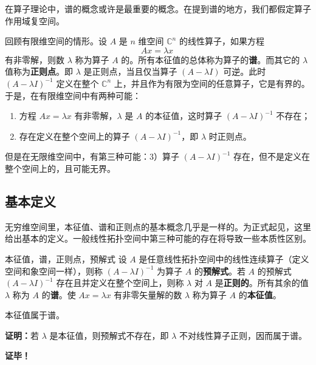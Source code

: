 
\cite{Ke1}在算子理论中，谱的概念或许是最重要的概念。在提到谱的地方，我们都假定算子作用域复空间。

回顾有限维空间的情形。设 $A$ 是 $n$ 维空间 $\mathbb C^n$ 的线性算子，如果方程
\begin{equation}
Ax=\lambda x~
\end{equation}
有非零解，则数 $\lambda$ 称为算子 $A$ 的。所有本征值的总体称为算子的\textbf{谱}。而其它的 $\lambda$ 值称为\textbf{正则点}。即 $\lambda$ 是正则点，当且仅当算子 $(A-\lambda I)$ 可逆。此时 $(A-\lambda I)^{-1}$ 定义在整个 $\mathbb C^n$ 上，并且作为有限为空间的任意算子，它是有界的。于是，在有限维空间中有两种可能：
\begin{enumerate}
\item 方程 $Ax=\lambda x$ 有非零解，$\lambda$ 是 $A$ 的本征值，这时算子 $(A-\lambda I)^{-1}$ 不存在；
\item 存在定义在整个空间上的算子 $(A-\lambda I)^{-1}$，即 $\lambda$ 时正则点。
\end{enumerate}

但是在无限维空间中，有第三种可能：3）算子 $(A-\lambda I)^{-1}$ 存在，但不是定义在整个空间上的，且可能无界。
\subsection{基本定义}
无穷维空间里，本征值、谱和正则点的基本概念几乎是一样的。为正式起见，这里给出基本的定义。一般线性拓扑空间中第三种可能的存在将导致一些本质性区别。
\begin{definition}{本征值，谱，正则点，预解式}
设 $A$ 是任意线性拓扑空间中的线性连续算子（定义空间和象空间一样），则称 $(A-\lambda I)^{-1}$ 为算子 $A$ 的\textbf{预解式}。若 $A$ 的预解式 $(A-\lambda I)^{-1}$ 存在且并定义在整个空间上，则称 $\lambda$ 对 $A$ 是\textbf{正则的}。所有其余的值 $\lambda$ 称为 $A$ 的\textbf{谱}。使 $Ax=\lambda x$ 有非零矢量解的数 $\lambda$ 称为算子 $A$ 的\textbf{本征值}。
\end{definition}

\begin{theorem}{}
本征值属于谱。
\end{theorem}

\textbf{证明：}若 $\lambda$ 是本征值，则预解式不存在，即 $\lambda$ 不对线性算子正则，因而属于谱。

\textbf{证毕！}

